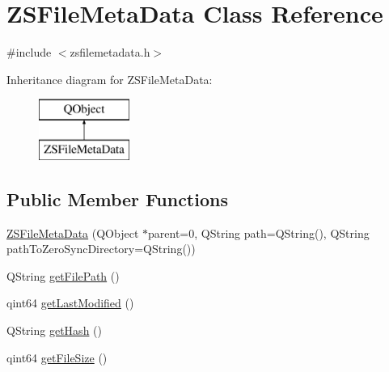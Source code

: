 \hypertarget{class_z_s_file_meta_data}{\section{Z\-S\-File\-Meta\-Data Class Reference}
\label{class_z_s_file_meta_data}
}


{\ttfamily \#include $<$zsfilemetadata.\-h$>$}

Inheritance diagram for Z\-S\-File\-Meta\-Data\-:\begin{figure}[H]
\begin{center}
\leavevmode
\includegraphics[height=2.000000cm]{class_z_s_file_meta_data}
\end{center}
\end{figure}
\subsection*{Public Member Functions}
\begin{DoxyCompactItemize}
\item 
\hyperlink{class_z_s_file_meta_data_a731a478cefcc8a9309d3a7c7c3a515f8}{Z\-S\-File\-Meta\-Data} (Q\-Object $\ast$parent=0, Q\-String path=Q\-String(), Q\-String path\-To\-Zero\-Sync\-Directory=Q\-String())
\item 
Q\-String \hyperlink{class_z_s_file_meta_data_a4de8705252b5f4f04d1327110f9fb97f}{get\-File\-Path} ()
\item 
qint64 \hyperlink{class_z_s_file_meta_data_a74c6702b8c5e79616ac6f1471f592e11}{get\-Last\-Modified} ()
\item 
Q\-String \hyperlink{class_z_s_file_meta_data_aa4330405660f5f326153b692b87477a2}{get\-Hash} ()
\item 
qint64 \hyperlink{class_z_s_file_meta_data_a7f3e513e794d08fb4e2d7c54b7b170be}{get\-File\-Size} ()
\end{DoxyCompactItemize}


